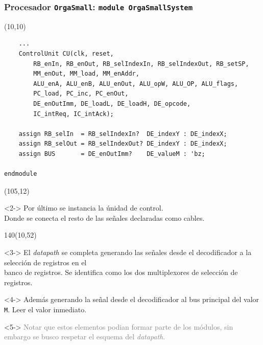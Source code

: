 \documentclass[aspectratio=169]{beamer}
\begin{document}
\begin{frame}[fragile,t]
    \frametitle{Procesador \texttt{OrgaSmall}: \texttt{module OrgaSmallSystem}}
    \begin{textblock}{90}(10,10)
\lstset{basicstyle=\tiny}
\begin{lstlisting}
    ...
    ControlUnit CU(clk, reset,
        RB_enIn, RB_enOut, RB_selIndexIn, RB_selIndexOut, RB_setSP,
        MM_enOut, MM_load, MM_enAddr,
        ALU_enA, ALU_enB, ALU_enOut, ALU_opW, ALU_OP, ALU_flags,
        PC_load, PC_inc, PC_enOut,
        DE_enOutImm, DE_loadL, DE_loadH, DE_opcode,
        IC_intReq, IC_intAck);
    
    assign RB_selIn  = RB_selIndexIn?  DE_indexY : DE_indexX;
    assign RB_selOut = RB_selIndexOut? DE_indexY : DE_indexX;
    assign BUS       = DE_enOutImm?    DE_valueM : 'bz;
    
endmodule
\end{lstlisting}
    \end{textblock}
    \begin{textblock}{40}(105,12)
    \small
    \begin{onlyenv}<2->
    Por último se instancia la únidad de control.\\
    \bigskip
    \textcolor{verdeuca}{Donde se conecta el resto de las señales declaradas como cables.}
    \end{onlyenv}
    \end{textblock}
    \begin{textblock}{140}(10,52)
    \small
    \begin{onlyenv}<3->
    El \emph{datapath} se completa generando las señales desde el decodificador a la selección de registros en el\\
    banco de registros. \textcolor{verdeuca}{Se identifica como los dos multiplexores de selección de registros.}\\
    \end{onlyenv}
    \bigskip
    \begin{onlyenv}<4->
    Además generando la señal desde el decodificador al bus principal del valor \texttt{M}. \textcolor{verdeuca}{Leer el valor inmediato.}\\
    \end{onlyenv}
    \bigskip
    \begin{onlyenv}<5->
    \textcolor{gray}{Notar que estos elementos podian formar parte de los módulos, sin embargo se busco respetar el esquema del \emph{datapath}.}
    \end{onlyenv}
    \end{textblock}
\end{frame}
\end{document}
